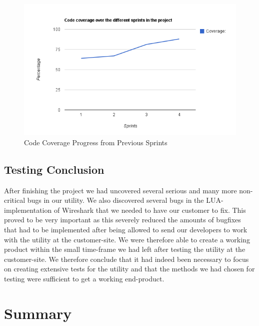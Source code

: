 \begin{figure}[htb]
	\center
	\includegraphics[width=\textwidth]{./sprints/img/sprint4_code_coverage_chart}
	\caption{Code Coverage Progress from Previous Sprints\label{fig:sp4CoverageChart}}
\end{figure}

\subsection{Testing Conclusion}
After finishing the project we had uncovered several serious and many more non-critical bugs in our utility. We also discovered several bugs in the LUA-implementation of Wireshark that we needed to have our customer to fix. This proved to be very important as this severely reduced the amounts of bugfixes that had to be implemented after being allowed to send our developers to work with the utility at the customer-site. We were therefore able to create a working product within the small time-frame we had left after testing the utility at the customer-site. We therefore conclude that it had indeed been necessary to focus on creating extensive tests for the utility and that the methods we had chosen for testing were sufficient to get a working end-product.




\section{Summary}

